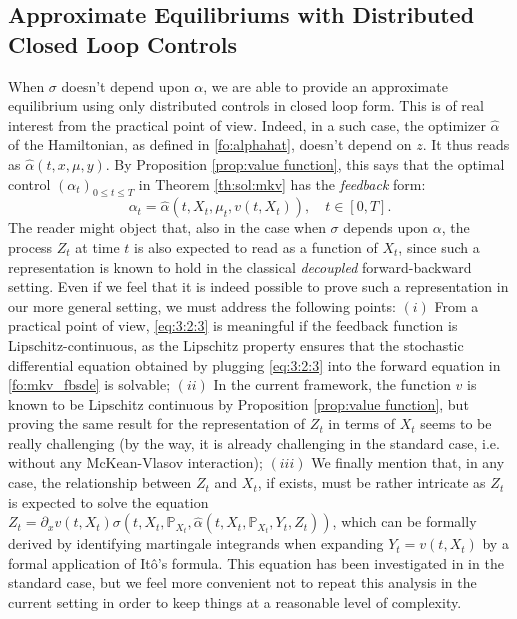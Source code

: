 \documentclass[11pt]{amsart}
\begin{document}
\subsection{Approximate Equilibriums with Distributed Closed Loop Controls}
When $\sigma$ doesn't depend upon $\alpha$, we are able to provide an approximate equilibrium using only distributed controls in closed loop form. This is of real interest from the practical point of view. Indeed, in a such case, the optimizer $\hat{\alpha}$ of the Hamiltonian, as defined in 
\eqref{fo:alphahat}, doesn't depend on $z$. It thus reads as $\hat{\alpha}(t,x,\mu,y)$.
By Proposition \ref{prop:value function}, this says that the optimal control
$(\alpha_{t})_{0 \leq t \leq T}$ in Theorem \ref{th:sol:mkv} has the \emph{feedback} form:
\begin{equation}
\label{eq:3:2:3}
\alpha_{t} = \hat{\alpha}(t,X_{t},\mu_{t},v(t,X_{t})), \quad t \in [0,T].
\end{equation}
The reader might object that, also in the case when $\sigma$ depends upon $\alpha$, the process $Z_{t}$ at time $t$ is also expected to read as a function 
of $X_{t}$, since such a representation is known to hold in the classical \emph{decoupled} forward-backward setting. Even if we feel that it is indeed possible to prove such a representation in our more general setting, we must address the following points: $(i)$ From a practical point of view, \eqref{eq:3:2:3} is meaningful if the feedback function is Lipschitz-continuous, as the Lipschitz property ensures that the stochastic differential equation obtained by plugging \eqref{eq:3:2:3} into the forward equation in \eqref{fo:mkv_fbsde} is solvable; $(ii)$ In the current framework, the function $v$ is known to be Lipschitz continuous by Proposition \ref{prop:value function}, but proving the same result for the representation of $Z_{t}$ in terms of $X_{t}$ seems to be really challenging (by the way, it is already challenging in the standard case, i.e. without any McKean-Vlasov interaction); $(iii)$ We finally mention that, in any case, the relationship between $Z_{t}$ and $X_{t}$, if exists, must be rather intricate as $Z_{t}$ is expected to solve the equation $Z_{t} = \partial_{x} v(t,X_{t}) \sigma(t,X_{t},{\mathbb P}_{X_{t}},\hat{\alpha}(t,X_{t},{\mathbb P}_{X_{t}},Y_{t},Z_{t}))$, which can be formally derived by identifying martingale integrands when expanding $Y_{t}=v(t,X_{t})$ by a formal application of It\^o's formula. This equation has been investigated in \cite{WuZhen} in the standard case, but we feel more convenient not to repeat this analysis in the current setting in order to keep things at a reasonable level of complexity. 
\vspace{4pt}
\end{document}
